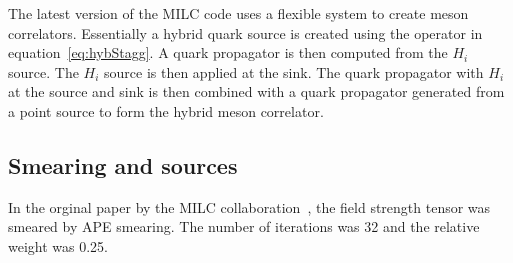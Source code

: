 \documentclass[12pt]{article}
\begin{document}
The latest version of the MILC code uses a flexible system to create
meson correlators. Essentially a hybrid quark source is created using
the operator in equation~\ref{eq:hybStagg}. A quark propagator is then 
computed from the $H_i$ source. The $H_i$ source is then applied at
the
sink. The quark propagator with $H_i$  at the source and sink 
is then combined with a quark propagator
generated from a point source to form the hybrid meson correlator.


\subsection{Smearing and sources}

In the orginal paper by the MILC collaboration~\cite{Bernard:2003jd}, 
the field strength tensor was smeared by APE smearing.
The number of iterations was 32 and the relative weight was 0.25.




\end{document}
